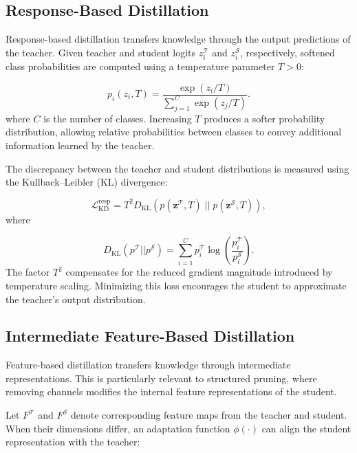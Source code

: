 \subsection{Response-Based Distillation}

Response-based distillation transfers knowledge through the output predictions of the teacher. Given teacher and student logits $z_i^{\mathcal{T}}$ and $z_i^{\mathcal{S}}$, respectively, softened class probabilities are computed using a temperature parameter $T>0$:

\begin{equation}
p_i(z_i,T) =
\frac{\exp(z_i/T)}
{\sum_{j=1}^{C} \exp(z_j/T)}.
\end{equation}
where $C$ is the number of classes. Increasing $T$ produces a softer probability distribution, allowing relative probabilities between classes to convey additional information learned by the teacher.

The discrepancy between the teacher and student distributions is measured using the Kullback--Leibler (KL) divergence:

\begin{equation}
\mathcal{L}_{\mathrm{KD}}^{\mathrm{resp}} = T^2 D_{\mathrm{KL}}\left(p(\mathbf{z}^{\mathcal{T}}, T)\;||\;p(\mathbf{z}^{\mathcal{S}}, T)\right),
\end{equation}
where

\begin{equation}
D_{\mathrm{KL}}
\left(
p^{\mathcal{T}} || p^{\mathcal{S}}
\right)
=
\sum_{i=1}^{C}
p_i^{\mathcal{T}}
\log
\left(
\frac{p_i^{\mathcal{T}}}
{p_i^{\mathcal{S}}}
\right).
\end{equation}
The factor $T^2$ compensates for the reduced gradient magnitude introduced by temperature scaling. Minimizing this loss encourages the student to approximate the teacher's output distribution.

\subsection{Intermediate Feature-Based Distillation}

Feature-based distillation transfers knowledge through intermediate representations. This is particularly relevant to structured pruning, where removing channels modifies the internal feature representations of the student.

Let $F^{\mathcal{T}}$ and $F^{\mathcal{S}}$ denote corresponding feature maps from the teacher and student. When their dimensions differ, an adaptation function $\phi(\cdot)$ can align the student representation with the teacher:

